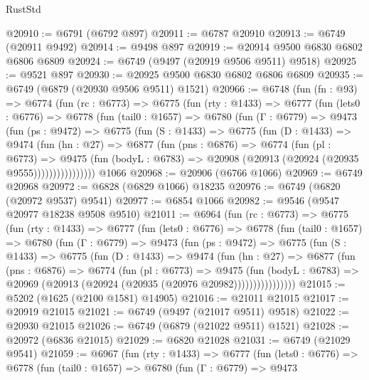 \begin{lexlean}{RustStd}
\begin{coremodule}
@20910 := @6791 (@6792 @897)
@20911 := @6787 @20910
@20913 := @6749 (@20911 @9492)
@20914 := @9498 @897
@20919 := @20914 @9500 @6830 @6802 @6806 @6809
@20924 := @6749 (@9497 (@20919 @9506 @9511) @9518)
@20925 := @9521 @897
@20930 := @20925 @9500 @6830 @6802 @6806 @6809
@20935 := @6749 (@6879 (@20930 @9506 @9511) @1521)
@20966 := @6748
    (fun (fn : @93) =>
    @6774
      (fun (rc : @6773) =>
      @6775
        (fun (rty : @1433) =>
        @6777
          (fun (lets0 : @6776) =>
          @6778
            (fun (tail0 : @1657) =>
            @6780
              (fun (Γ : @6779) =>
              @9473
                (fun (ps : @9472) =>
                @6775
                  (fun (S : @1433) =>
                  @6775
                    (fun (D : @1433) =>
                    @9474
                      (fun (hn : @27) =>
                      @6877
                        (fun (pns : @6876) =>
                        @6774
                          (fun (pl : @6773) =>
                          @9475
                            (fun (bodyL : @6783) =>
                            @20908 (@20913 (@20924 (@20935 @9555))))))))))))))))
    @1066
@20968 := @20906 (@6766 @1066)
@20969 := @6749 @20968
@20972 := @6828 (@6829 @1066) @18235
@20976 := @6749 (@6820 (@20972 @9537) @9541)
@20977 := @6854 @1066
@20982 := @9546 (@9547 @20977 @18238 @9508 @9510)
@21011 := @6964
    (fun (rc : @6773) =>
    @6775
      (fun (rty : @1433) =>
      @6777
        (fun (lets0 : @6776) =>
        @6778
          (fun (tail0 : @1657) =>
          @6780
            (fun (Γ : @6779) =>
            @9473
              (fun (ps : @9472) =>
              @6775
                (fun (S : @1433) =>
                @6775
                  (fun (D : @1433) =>
                  @9474
                    (fun (hn : @27) =>
                    @6877
                      (fun (pns : @6876) =>
                      @6774
                        (fun (pl : @6773) =>
                        @9475
                          (fun (bodyL : @6783) =>
                          @20969 (@20913 (@20924 (@20935 (@20976 @20982))))))))))))))))
@21015 := @5202 (@1625 (@2100 @1581) @14905)
@21016 := @21011 @21015
@21017 := @20919 @21015
@21021 := @6749 (@9497 (@21017 @9511) @9518)
@21022 := @20930 @21015
@21026 := @6749 (@6879 (@21022 @9511) @1521)
@21028 := @20972 (@6836 @21015)
@21029 := @6820 @21028
@21031 := @6749 (@21029 @9541)
@21059 := @6967
    (fun (rty : @1433) =>
    @6777
      (fun (lets0 : @6776) =>
      @6778
        (fun (tail0 : @1657) =>
        @6780
          (fun (Γ : @6779) =>
          @9473

\end{coremodule}
\end{lexlean}
